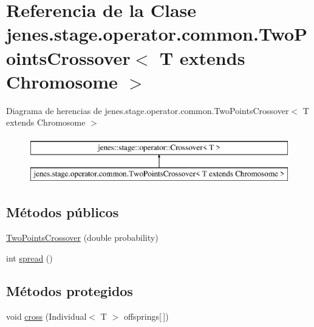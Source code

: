 \hypertarget{classjenes_1_1stage_1_1operator_1_1common_1_1_two_points_crossover_3_01_t_01extends_01_chromosome_01_4}{\section{Referencia de la Clase jenes.\-stage.\-operator.\-common.\-Two\-Points\-Crossover$<$ T extends Chromosome $>$}
\label{classjenes_1_1stage_1_1operator_1_1common_1_1_two_points_crossover_3_01_t_01extends_01_chromosome_01_4}
}
Diagrama de herencias de jenes.\-stage.\-operator.\-common.\-Two\-Points\-Crossover$<$ T extends Chromosome $>$\begin{figure}[H]
\begin{center}
\leavevmode
\includegraphics[height=2.000000cm]{classjenes_1_1stage_1_1operator_1_1common_1_1_two_points_crossover_3_01_t_01extends_01_chromosome_01_4}
\end{center}
\end{figure}
\subsection*{Métodos públicos}
\begin{DoxyCompactItemize}
\item 
\hyperlink{classjenes_1_1stage_1_1operator_1_1common_1_1_two_points_crossover_3_01_t_01extends_01_chromosome_01_4_ab7fe58d08e9e9b89881661c16e80f19e}{Two\-Points\-Crossover} (double probability)
\item 
int \hyperlink{classjenes_1_1stage_1_1operator_1_1common_1_1_two_points_crossover_3_01_t_01extends_01_chromosome_01_4_a30115e5f2250765209bed48bda1e5155}{spread} ()
\end{DoxyCompactItemize}
\subsection*{Métodos protegidos}
\begin{DoxyCompactItemize}
\item 
void \hyperlink{classjenes_1_1stage_1_1operator_1_1common_1_1_two_points_crossover_3_01_t_01extends_01_chromosome_01_4_a5cf79fb6f728917f5ba48960ff6814ed}{cross} (Individual$<$ T $>$ offsprings\mbox{[}$\,$\mbox{]})
\end{DoxyCompactItemize}


